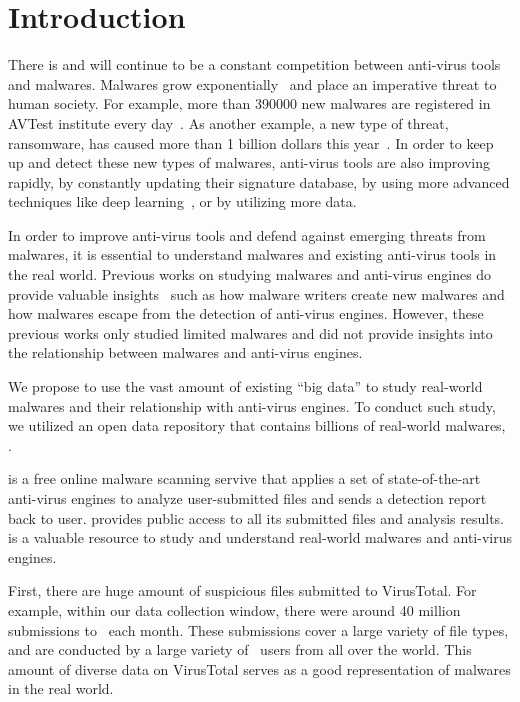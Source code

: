\section{Introduction}
\label{sec:intro}

There is and will continue to be a constant competition between anti-virus tools and malwares.
Malwares grow exponentially~\cite{avtest} and place an imperative threat to human society. 
For example, more than 390000 new malwares are registered in AVTest institute every day~\cite{avtest}.
As another example, a new type of threat, ransomware, has caused more than 1 billion dollars this year~\cite{ransomware}. 
In order to keep up and detect these new types of malwares, anti-virus tools are also improving rapidly,
by constantly updating their signature database, by using more advanced techniques like deep learning~\cite{cylance}, or by utilizing more data. 

In order to improve anti-virus tools and defend against emerging threats from malwares, 
it is essential to understand malwares and existing anti-virus tools in the real world. 
Previous works on studying malwares and anti-virus engines do provide valuable 
insights~\cite{ZhouSP2012,GuptaComsnets2009, vendors-study} such as  
how malware writers create new malwares and how malwares escape from the detection of anti-virus engines.
However, these previous works only studied limited malwares
and did not provide insights into the relationship between malwares and anti-virus engines. 

We propose to use the vast amount of existing ``big data'' 
to study real-world malwares and their relationship with anti-virus engines.
To conduct such study, we utilized an open data repository
that contains billions of real-world malwares, {\em \vt}.

\vt{} is a free online malware scanning servive
that applies a set of state-of-the-art anti-virus engines to analyze user-submitted files 
and sends a detection report back to user.
\vt{} provides public access to all its submitted files and analysis results. 
\vt{} is a valuable resource to study and 
understand real-world malwares and anti-virus engines. 

First, there are huge amount of suspicious files submitted to VirusTotal. 
For example, within our data collection window, 
there were around 40 million submissions to \vt\ each month. 
These submissions cover a large variety of file types, and 
are conducted by a large variety of \vt\ users from all over the world. 
This amount of diverse data on VirusTotal serves as a good representation of malwares in the real world.  

